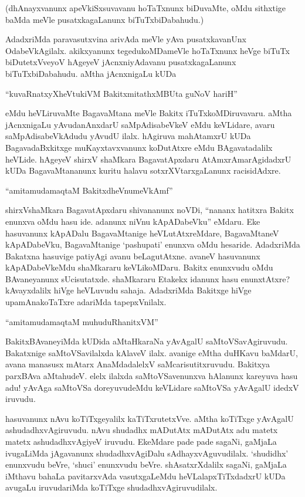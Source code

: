 (dhAnayxvanunx apeVkiSxsuvavanu hoTaTxnunx biDuvaMte, oMdu sithxtige baMda meVle pusatxkagaLanunx biTuTxbiDabahudu.)

AdadxriMda paravasutxvina arivAda meVle yAva pusatxkavanUnx OdabeVkAgilalx. akikxyanunx tegedukoMDameVle hoTaTxnunx heVge biTuTx biDutetxVveyoV hAgeyeV jAcnxniyAdavanu pusatxkagaLanunx biTuTxbiDabahudu. aMtha jAcnxnigaLu kUDa

\begin{shloka}
``kuvaRnatxyXheVtukiVM BakitxmitathxMBUta guNoV hariH''
\end{shloka}

eMdu heVLiruvaMte BagavaMtana meVle Bakitx iTuTxkoMDiruvavaru. aMtha jAcnxnigaLu yAvudanAnxdarU saMpAdisabeVkeV eMdu keVLidare, avaru saMpAdisabeVkAdudu yAvudU ilalx. hAgiruva mahAtamxrU kUDa BagavadaBxkitxge muKayxtavxvanunx koDutAtxre eMdu BAgavatadalilx heVLide. hAgeyeV shirxV shaMkara BagavatApxdaru AtAmxrAmarAgidadxrU kUDa BagavaMtananunx kuritu halavu sotxrXVtarxgaLanunx racisidAdxre.

\begin{shloka}
``amitamudamaqtaM BakitxdheVnumeVkAmf''
\end{shloka}

shirxVshaMkara BagavatApxdaru shivananunx noVDi, ``nananx hatitxra Bakitx enunxva oMdu hasu ide. adanunx niVnu kApADabeVku'' eMdaru. Eke hasuvanunx kApADalu BagavaMtanige heVLutAtxreMdare, BagavaMtaneV kApADabeVku, BagavaMtanige `pashupati' enunxva oMdu hesaride. AdadxriMda Bakatxna hasuvige patiyAgi avanu beLagutAtxne. avaneV hasuvanunx kApADabeVkeMdu shaMkararu keVLikoMDaru. Bakitx enunxvudu oMdu BAvaneyanunx sUcisutatxde. shaMkararu Etakekx idanunx hasu enunxtAtxre? kAvayxdalilx hiVge heVLuvudu sahaja. AdadxriMda Bakitxge hiVge upamAnakoTaTxre adariMda tapepxVnilalx.

\begin{shloka}
``amitamudamaqtaM muhuduRhanitxVM''
\end{shloka}

BakitxBAvaneyiMda kUDida aMtaHkaraNa yAvAgalU saMtoVSavAgiruvudu. Bakatxnige saMtoVSavilalxda kAlaveV ilalx. avanige eMtha duHKavu baMdarU, avana manasusx mAtarx AnaMdadalelxV saMcarisutitxruvudu. Bakitxya parxBAva aMtahudeV. elelx ilalxda saMtoVSavenunxva hAlanunx kareyuva hasu adu! yAvAga saMtoVSa doreyuvudeMdu keVLidare saMtoVSa yAvAgalU idedxV iruvudu.

hasuvanunx nAvu koTiTxgeyalilx kaTiTxrutetxVve. aMtha koTiTxge yAvAgalU ashudadhxvAgiruvudu. nAvu shudadhx mADutAtx mADutAtx adu matetx matetx ashudadhxvAgiyeV iruvudu. EkeMdare pade pade sagaNi, gaMjaLa ivugaLiMda jAgavanunx shudadhxvAgiDalu sAdhayxvAguvudilalx. `shudidhx' enunxvudu beVre, `shuci' enunxvudu beVre. shAsatxrXdalilx sagaNi, gaMjaLa iMthavu bahaLa pavitarxvAda vasutxgaLeMdu heVLalapxTiTxdadxrU kUDa avugaLu iruvudariMda koTiTxge shudadhxvAgiruvudilalx.

